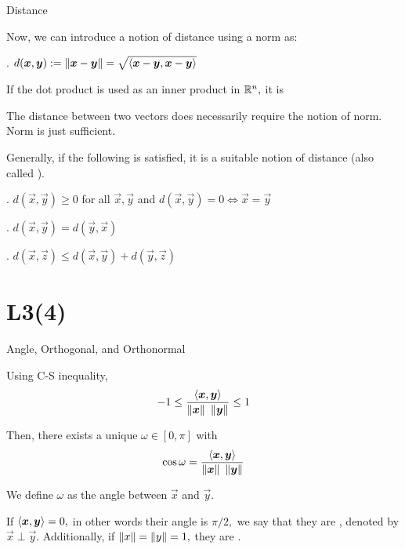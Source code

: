 \documentclass[fleqn,aspectratio=169]{beamer}
\begin{document}
\begin{frame}{Distance}

\plitemsep 0.1in

\bci 

\item Now, we can introduce a notion of distance using a norm as:

\medskip
{}. $d(\bm{x},\bm{y}) := \left \lVert \bm{x} - \bm{y} \right \rVert = \sqrt{\left\langle \bm{x}-\bm{y}, \bm{x}-\bm{y} \right\rangle} $

\item If the dot product is used as an inner product in ${\mathbb R}^n,$ it is 

\item {} The distance between two vectors does  necessarily require the notion of norm. Norm is just sufficient. 

\item Generally, if the following is satisfied, it is a suitable notion of distance (also called ). 
\bci
\item {}. $d(\vec{x},\vec{y}) \ge 0$ for all $\vec{x},\vec{y}$ and $d(\vec{x},\vec{y}) = 0 \Longleftrightarrow \vec{x}=\vec{y}$ 
\item {}. $d(\vec{x},\vec{y}) = d(\vec{y},\vec{x})$
\item {}. $d(\vec{x},\vec{z}) \le d(\vec{x},\vec{y}) + d(\vec{y},\vec{z})$
\eci
\eci
\end{frame}

\section{L3(4)}
\begin{frame}{Angle,  Orthogonal, and Orthonormal}

\plitemsep 0.1in

\bci 

\item Using C-S inequality, $$-1 \le \frac{\left\langle \bm{x}, \bm{y} \right\rangle}{\left \lVert \bm{x} \right \rVert \ \left \lVert \bm{y} \right \rVert} \le 1$$

\item Then, there exists a unique $\omega \in [0,\pi]$ with $$\cos \omega = \frac{\inner{\vec{x}}{\vec{y}}}{\norm{\vec{x}} \ \norm{\vec{y}}}$$

\item We define $\omega$ as the angle between $\vec{x}$ and $\vec{y}.$

\item {} If $\left\langle \bm{x}, \bm{y} \right\rangle = 0,$ in other words their angle is $\pi/2,$ we say that they are , denoted by $\vec{x} \perp \vec{y}.$ Additionally, if $\left \lVert x \right \rVert = \left \lVert y \right \rVert =1,$ they are .
\eci
\end{frame}
\end{document}
